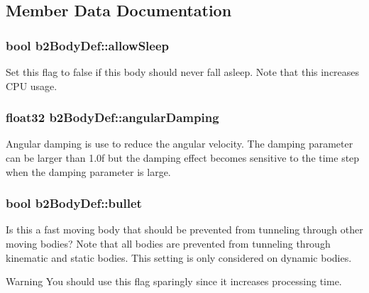 \subsection{Member Data Documentation}
\subsubsection[{\texorpdfstring{allow\+Sleep}{allowSleep}}]{\setlength{\rightskip}{0pt plus 5cm}bool b2\+Body\+Def\+::allow\+Sleep}\hypertarget{structb2_body_def_a0765068172e521ed63cb34084c59c003}{}\label{structb2_body_def_a0765068172e521ed63cb34084c59c003}
Set this flag to false if this body should never fall asleep. Note that this increases C\+PU usage. 
\subsubsection[{\texorpdfstring{angular\+Damping}{angularDamping}}]{\setlength{\rightskip}{0pt plus 5cm}float32 b2\+Body\+Def\+::angular\+Damping}\hypertarget{structb2_body_def_a01b8dc8ad9f0962efef9e4a8e836feb6}{}\label{structb2_body_def_a01b8dc8ad9f0962efef9e4a8e836feb6}
Angular damping is use to reduce the angular velocity. The damping parameter can be larger than 1.\+0f but the damping effect becomes sensitive to the time step when the damping parameter is large. 
\subsubsection[{\texorpdfstring{bullet}{bullet}}]{\setlength{\rightskip}{0pt plus 5cm}bool b2\+Body\+Def\+::bullet}\hypertarget{structb2_body_def_a7c0047c9a98a1d20614eeddcdbce7586}{}\label{structb2_body_def_a7c0047c9a98a1d20614eeddcdbce7586}
Is this a fast moving body that should be prevented from tunneling through other moving bodies? Note that all bodies are prevented from tunneling through kinematic and static bodies. This setting is only considered on dynamic bodies. \begin{DoxyWarning}{Warning}
You should use this flag sparingly since it increases processing time. 
\end{DoxyWarning}
